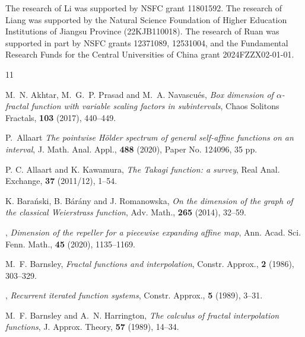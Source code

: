 \documentclass[11pt]{amsart}
\theoremstyle{definition}
\theoremstyle{remark}
\numberwithin{equation}{section}
\begin{document}
\bigskip
{}
The research of Li was supported by NSFC grant 11801592. The research of Liang was supported by the Natural Science Foundation of Higher Education Institutions of Jiangsu Province (22KJB110018). The research of Ruan was supported in part by NSFC grants 12371089, 12531004, and the Fundamental Research Funds for the Central Universities of China grant 2024FZZX02-01-01.




\begin{thebibliography}{11}


{\sc M.~N. Akhtar, M.~G.~P. Prasad and M.~A. Navascu\'{e}s},
{\em Box dimension of $\alpha$-fractal function with variable scaling factors in subintervals},
Chaos Solitons Fractals, {\bf 103} (2017), 440--449.

{\sc P.~Allaart}
{\em The pointwise H\"{o}lder spectrum of general self-affine functions on an interval}, 
J. Math. Anal. Appl., {\bf 488} (2020), Paper No. 124096, 35 pp.


	{\sc P. C. Allaart and K. Kawamura}, {\em The Takagi function: a survey}, Real Anal. Exchange,
	{\bf 37} (2011/12), 1--54.
	
	
 {\sc K. Bara\'nski, B. B\'ar\'any and J. Romanowska}, {\em On the dimension of the graph of the classical Weierstrass function}, Adv. Math., {\bf 265} (2014), 32--59. 
	
, {\em Dimension of the repeller for a piecewise expanding affine map}, Ann. Acad. Sci. Fenn. Math., {\bf 45} (2020), 1135--1169.

 {\sc M.~F. Barnsley}, {\em Fractal functions and interpolation}, Constr. Approx., {\bf 2} (1986), 303--329.

, {\em Recurrent iterated function systems}, Constr. Approx., {\bf 5} (1989), 3--31.


{\sc M.~F. Barnsley and A.~N. Harrington}, {\em The calculus of fractal interpolation functions}, J. Approx. Theory, {\bf 57} (1989), 14--34.


\end{thebibliography}
\end{document}

